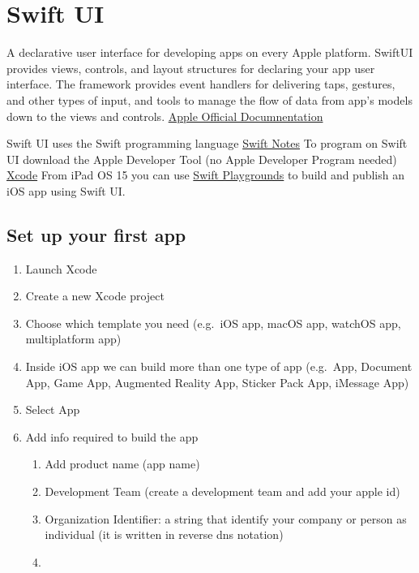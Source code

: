 \documentclass[]{article}
\providecommand{\tightlist}{%
  \setlength{\itemsep}{0pt}\setlength{\parskip}{0pt}}
\begin{document}
\hypertarget{swift-ui}{%
\section{Swift UI}\label{swift-ui}}

A declarative user interface for developing apps on every Apple
platform. SwiftUI provides views, controls, and layout structures for
declaring your app user interface. The framework provides event handlers
for delivering taps, gestures, and other types of input, and tools to
manage the flow of data from app's models down to the views and
controls.
\href{https://developer.apple.com/documentation/swiftui/}{Apple Official
Documnentation}

Swift UI uses the Swift programming language
\href{https://github.com/nick88msn/swift-starter-kit}{Swift Notes} To
program on Swift UI download the Apple Developer Tool (no Apple
Developer Program needed)
\href{https://apps.apple.com/us/app/xcode/id497799835?mt=12}{Xcode} From
iPad OS 15 you can use
\href{https://apps.apple.com/app/id908519492}{Swift Playgrounds} to
build and publish an iOS app using Swift UI.

\hypertarget{set-up-your-first-app}{%
\subsection{Set up your first app}\label{set-up-your-first-app}}

\begin{enumerate}
\def\labelenumi{\arabic{enumi}.}
\tightlist
\item
  Launch Xcode
\item
  Create a new Xcode project
\item
  Choose which template you need (e.g.~iOS app, macOS app, watchOS app,
  multiplatform app)
\item
  Inside iOS app we can build more than one type of app (e.g.~App,
  Document App, Game App, Augmented Reality App, Sticker Pack App,
  iMessage App)
\item
  Select App
\item
  Add info required to build the app

  \begin{enumerate}
  \def\labelenumii{\arabic{enumii}.}
  \item
    Add product name (app name)
  \item
    Development Team (create a development team and add your apple id)
  \item
    Organization Identifier: a string that identify your company or
    person as individual (it is written in reverse dns notation)
  \item
  \end{enumerate}
\end{enumerate}
\end{document}
